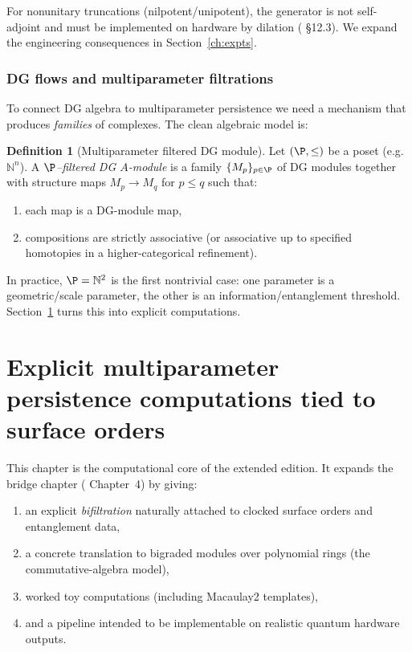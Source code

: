 \documentclass[11pt,oneside]{amsbook}
\numberwithin{equation}{section}
\theoremstyle{plain}
\theoremstyle{definition}
\newtheorem{definition}[theorem]{Definition}
\theoremstyle{remark}
\newcommand{\N}{\mathbb{N}}
\begin{document}
For nonunitary truncations (nilpotent/unipotent), the generator is not self-adjoint and must be implemented on hardware by dilation ( \S12.3).
We expand the engineering consequences in Section~\ref{ch:expts}.

\subsection{DG flows and multiparameter filtrations}
\label{sec:dg_filtrations}

To connect DG algebra to multiparameter persistence we need a mechanism that produces \emph{families} of complexes.
The clean algebraic model is:

\begin{definition}[Multiparameter filtered DG module]
Let $(\P,\le)$ be a poset (e.g.\ $\N^n$).
A \emph{$\P$--filtered DG $A$-module} is a family $\{M_p\}_{p\in\P}$ of DG modules together with structure maps $M_p\to M_q$ for $p\le q$ such that:
\begin{enumerate}
\item each map is a DG-module map,
\item compositions are strictly associative (or associative up to specified homotopies in a higher-categorical refinement).
\end{enumerate}
\end{definition}

In practice, $\P=\N^2$ is the first nontrivial case: one parameter is a geometric/scale parameter, the other is an information/entanglement threshold.
Section~\ref{ch:persistence} turns this into explicit computations.

\chapter{Explicit multiparameter persistence computations tied to surface orders}

\label{ch:persistence}


This chapter is the computational core of the extended edition.
It expands the  bridge chapter ( Chapter~4) by giving:
\begin{enumerate}
\item an explicit \emph{bifiltration} naturally attached to clocked surface orders and entanglement data,
\item a concrete translation to bigraded modules over polynomial rings (the commutative-algebra model),
\item worked toy computations (including Macaulay2 templates),
\item and a pipeline intended to be implementable on realistic quantum hardware outputs.
\end{enumerate}
\end{document}
